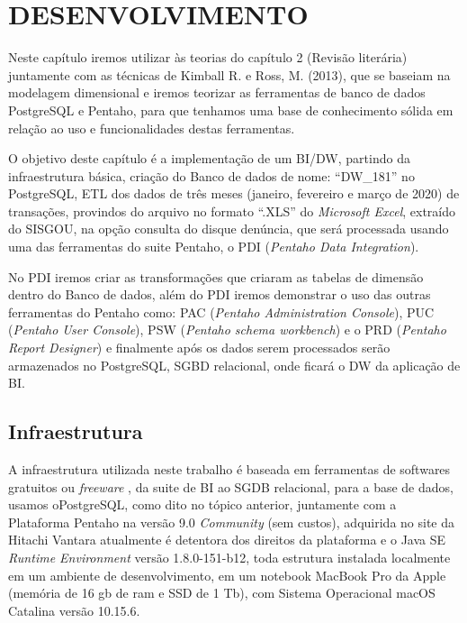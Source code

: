 %
%

\chapter{DESENVOLVIMENTO}

Neste capítulo iremos utilizar \`{a}s teorias do capítulo 2 (Revis\~{a}o liter\'{a}ria) juntamente com as t\'{e}cnicas de Kimball R. e Ross, M. (2013), que se baseiam na modelagem dimensional e iremos teorizar as ferramentas de banco de dados PostgreSQL e Pentaho, para que tenhamos uma base de conhecimento s\'olida em rela\c{c}\~{a}o ao uso e funcionalidades destas ferramentas.

O objetivo deste capítulo \'{e} a implementa\c{c}\~{a}o de um BI/DW, partindo da infraestrutura b\'{a}sica, cria\c{c}\~{a}o do Banco de dados de nome: ``DW\_181'' no PostgreSQL, ETL dos dados de três meses  (janeiro, fevereiro e mar\c{c}o de 2020) de transa\c{c}\~{o}es, provindos do arquivo no formato ``.XLS'' do \textit{Microsoft Excel},  extraído do SISGOU, na op\c{c}\~{a}o consulta do disque denúncia, que ser\'{a} processada usando uma das ferramentas do suite Pentaho, o PDI (\textit{Pentaho Data Integration}).

No PDI iremos criar as transforma\c{c}\~{o}es que criaram as tabelas de dimens\~{a}o dentro do Banco de dados, al\'{e}m do PDI iremos demonstrar o uso das outras ferramentas do Pentaho como: PAC (\textit{Pentaho Administration Console}), PUC (\textit{Pentaho User Console}), PSW (\textit{Pentaho schema workbench}) e o PRD (\textit{Pentaho Report Designer}) e finalmente ap\'os os dados serem processados ser\~{a}o armazenados no PostgreSQL, SGBD relacional, onde ficar\'{a} o DW da aplica\c{c}\~{a}o de BI.

\section{Infraestrutura}

A infraestrutura utilizada neste trabalho \'{e} baseada em ferramentas de softwares gratuitos ou \textit{freeware} , da suite de BI ao SGDB relacional, para a base de dados, usamos oPostgreSQL, como dito no t\'opico anterior, juntamente com a Plataforma Pentaho na vers\~{a}o 9.0 \textit{Community} (sem custos), adquirida no site da Hitachi Vantara atualmente \'{e} detentora dos direitos da plataforma e o Java SE \textit{Runtime Environment} vers\~{a}o 1.8.0-151-b12, toda estrutura instalada localmente em um ambiente de desenvolvimento, em um notebook MacBook Pro da Apple (mem\'oria de 16 gb de ram e SSD de 1 Tb), com Sistema Operacional macOS Catalina vers\~{a}o 10.15.6.

